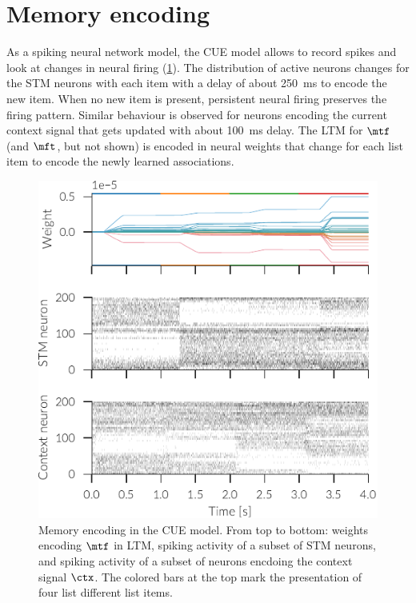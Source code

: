 \section{Memory encoding}
As a spiking neural network model, the CUE model allows to record spikes and look at changes in neural firing (\cref{fig:spikes}).
The distribution of active neurons changes for the STM neurons with each item with a delay of about \SI{250}{\milli\second} to encode the new item.
When no new item is present, persistent neural firing preserves the firing pattern.
Similar behaviour is observed for neurons encoding the current context signal that gets updated with about \SI{100}{\milli\second} delay.
The LTM for $\mtf$ (and $\mft$, but not shown) is encoded in neural weights that change for each list item to encode the newly learned associations.
\begin{figure}
    \centering
    \includegraphics{figures/spikes}
    \caption[Memory encoding in the CUE model]{Memory encoding in the CUE model. From top to bottom: weights encoding $\mtf$ in LTM, spiking activity of a subset of STM neurons, and spiking activity of a subset of neurons encdoing the context signal $\ctx$. The colored bars at the top mark the presentation of four list different list items.}\label{fig:spikes}
\end{figure}
